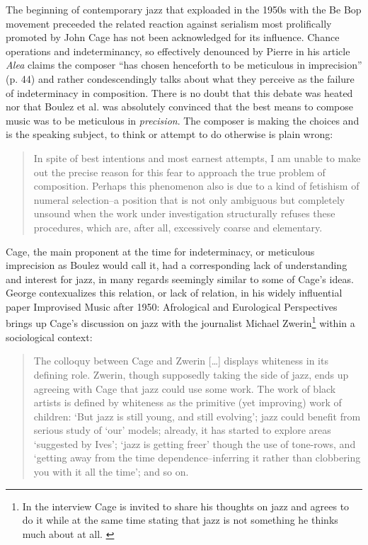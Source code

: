 \documentclass[a4paper]{article}
\begin{document}
The beginning of contemporary jazz that exploaded in the 1950s with the Be Bop movement preceeded the related reaction against serialism most prolifically promoted by John Cage has not been acknowledged for its influence. Chance operations and indeterminancy, so effectively denounced by Pierre \citet{boulez64} in his article \emph{Alea} claims the composer ``has chosen henceforth to be meticulous in imprecision'' (p. 44) and rather condescendingly talks about what they perceive as the failure of indeterminacy in composition. There is no doubt that this debate was heated nor that Boulez et al. was absolutely convinced that the best means to compose music was to be meticulous in \emph{precision}. The composer is making the choices and is the speaking subject, to think or attempt to do otherwise is plain wrong:

\begin{quote} 
In spite of best intentions and most earnest attempts, I am unable to make out the precise reason for this fear to approach the true problem of composition. Perhaps this phenomenon also is due to a kind of fetishism of numeral selection--a position that is not only ambiguous but completely unsound when the work under investigation structurally refuses these procedures, which are, after all, excessively coarse and elementary.
\citep[p. 44][]{boulez64}
\end{quote}

Cage, the main proponent at the time for indeterminacy, or meticulous imprecision as Boulez would call it, had a corresponding lack of understanding and interest for jazz, in many regards seemingly similar to some of Cage's ideas. George \citet{lewis-1} contexualizes this relation, or lack of relation, in his widely influential paper Improvised Music after 1950: Afrological and Eurological Perspectives brings up Cage's discussion on jazz with the journalist Michael Zwerin\footnote{In the interview Cage is invited to share his thoughts on jazz and agrees to do it while at the same time stating that jazz is not something he thinks much about at all. \citep[In]{lewis-1}} within a sociological context:

\begin{quote} 
The colloquy between Cage and Zwerin [\ldots] displays whiteness in its defining   role. Zwerin, though supposedly taking the side of jazz, ends up agreeing with Cage that jazz could   use some work. The work of black artists is defined by whiteness as the primitive (yet improving)   work of children: `But jazz is still young, and still evolving'; jazz could benefit from serious   study of `our' models; already, it has started to explore areas `suggested by Ives'; `jazz is   getting freer' though the use of tone-rows, and `getting away from the time dependence--inferring   it rather than clobbering you with it all the time'; and so on. \citep[p. 104][]{lewis-1} 
\end{quote}
\end{document}
